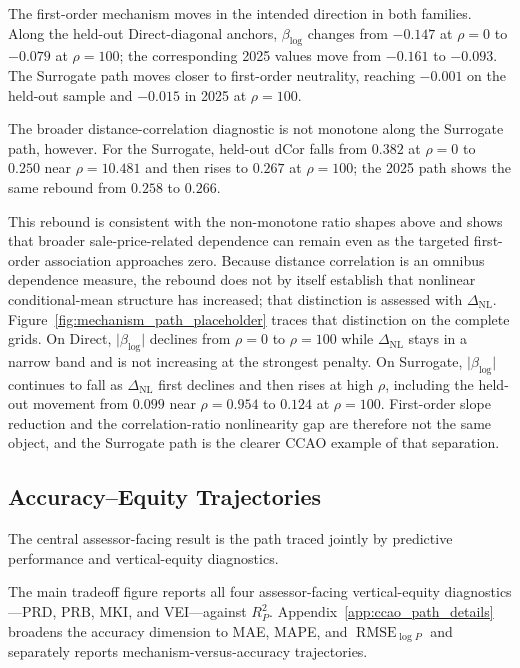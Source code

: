 \documentclass[10pt]{article}
\theoremstyle{definition}
\newcommand{\1}{\mathbf{1}}
\begin{document}
The first-order mechanism moves in the intended direction in both families. Along
the held-out Direct-diagonal anchors, $\beta_{\log}$ changes from $-0.147$ at
$\rho=0$ to $-0.079$ at $\rho=100$; the corresponding 2025 values move from
$-0.161$ to $-0.093$. The Surrogate path moves closer to first-order neutrality,
reaching $-0.001$ on the held-out sample and $-0.015$ in 2025 at $\rho=100$.

The broader distance-correlation diagnostic is not monotone along the Surrogate path, however. For the Surrogate,
held-out dCor falls from $0.382$ at $\rho=0$ to $0.250$ near
$\rho=10.481$ and then rises to $0.267$ at $\rho=100$; the 2025 path shows
the same rebound from $0.258$ to $0.266$.

This rebound is consistent with the non-monotone ratio shapes above and shows that broader sale-price-related dependence can remain even as the targeted first-order association approaches zero. Because distance correlation is an omnibus dependence measure, the rebound does not by itself establish that nonlinear conditional-mean structure has increased; that distinction is assessed with $\Delta_{\mathrm{NL}}$.
Figure~\ref{fig:mechanism_path_placeholder} traces that distinction on the complete grids. On Direct, $\lvert\beta_{\log}\rvert$ declines from $\rho=0$ to $\rho=100$ while $\Delta_{\mathrm{NL}}$ stays in a narrow band and is not increasing at the strongest penalty. On Surrogate, $\lvert\beta_{\log}\rvert$ continues to fall as $\Delta_{\mathrm{NL}}$ first declines and then rises at high $\rho$, including the held-out movement from $0.099$ near $\rho=0.954$ to $0.124$ at $\rho=100$. First-order slope reduction and the correlation-ratio nonlinearity gap are therefore not the same object, and the Surrogate path is the clearer CCAO example of that separation.

\subsection{Accuracy--Equity Trajectories}
\label{subsec:tradeoff_results}

The central assessor-facing result is the path traced jointly by predictive
performance and vertical-equity diagnostics.

The main tradeoff figure reports all four assessor-facing vertical-equity diagnostics---PRD, PRB, MKI, and VEI---against $R^2_P$. Appendix~\ref{app:ccao_path_details} broadens the accuracy dimension to MAE, MAPE, and $\operatorname{RMSE}_{\log P}$ and separately reports mechanism-versus-accuracy trajectories.
\end{document}

